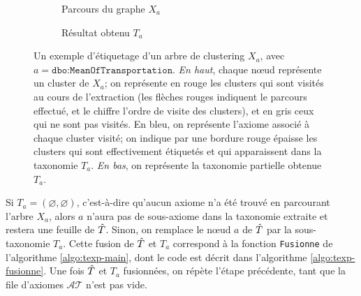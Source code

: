 \begin{figure}
    \centering
    \begin{subfigure}{\textwidth}
        \centering
        
        \caption{Parcours du graphe $X_a$}
        \label{subfig:texp-sbs1}
    \end{subfigure}
    \begin{subfigure}{\textwidth}
        \centering
        
        \caption{Résultat obtenu $T_a$}
        \label{subfig:texp-sbs2}
    \end{subfigure}
    \caption[Parcours et étiquetage d'un arbre de clustering]{Un exemple d'étiquetage d'un arbre de clustering $X_a$, avec $a = \texttt{dbo:MeanOfTransportation}$. \textit{En haut}, chaque nœud représente un cluster de $X_a$; on représente en rouge les clusters qui sont visités au cours de l'extraction (les flèches rouges indiquent le parcours effectué, et le chiffre l'ordre de visite des clusters), et en gris ceux qui ne sont pas visités. En bleu, on représente l'axiome associé à chaque cluster visité; on indique par une bordure rouge épaisse les clusters qui sont effectivement étiquetés et qui apparaissent dans la taxonomie $T_a$. \textit{En bas}, on représente la taxonomie partielle obtenue $T_a$.}
    \label{fig:texp-stebbstep}
\end{figure}

%    


Si $T_a = (\varnothing, \varnothing)$, c'est-à-dire qu'aucun axiome n'a été trouvé en parcourant l'arbre $X_a$, alors $a$ n'aura pas de sous-axiome dans la taxonomie extraite et restera une feuille de $\hat{T}$. Sinon, on remplace le nœud $a$ de $\hat{T}$ par la sous-taxonomie $T_a$. Cette fusion de $\hat{T}$ et $T_a$ correspond à la fonction \texttt{Fusionne} de l'algorithme \ref{algo:texp-main}, dont le code est décrit dans l'algorithme \ref{algo:texp-fusionne}. Une fois $\hat{T}$ et $T_a$ fusionnées, on répète l'étape précédente, tant que la file d'axiomes $\mathcal{AT}$ n'est pas vide.

